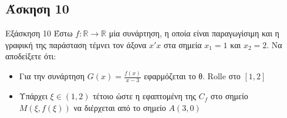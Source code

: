 \documentclass[greek]{beamer}
\begin{document}
\subsection{Άσκηση 10}
\begin{frame}[label=Άσκηση10]{Εξάσκηση 10}
 Έστω $f:\mathbb{R}\to\mathbb{R}$ μία συνάρτηση, η οποία είναι παραγωγίσιμη και η γραφική της παράσταση τέμνει τον άξονα $x'x$ στα σημεία $x_1=1$ και $x_2=2$. Να αποδείξετε ότι:
 \begin{itemize}
  \item Για την συνάρτηση $G(x)=\frac{f(x)}{x-3}$ εφαρμόζεται το θ. Rolle στο $[1,2]$
  \item Υπάρχει $ξ\in (1,2)$ τέτοιο ώστε η εφαπτομένη της $C_f$ στο σημείο $Μ(ξ,f(ξ))$ να διέρχεται από το σημείο $Α(3,0)$
 \end{itemize}
\end{frame}
\end{document}
